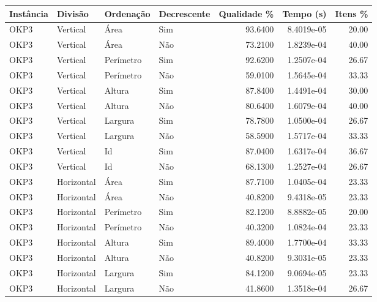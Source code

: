 \begin{tabular}{llllrrr}
    \hline
    Instância & Divisão     & Ordenação & Decrescente & Qualidade \% & Tempo (s)  & Itens \% \\
    \hline
    OKP3      & Vertical    & Área      & Sim         & 93.6400      & 8.4019e-05 & 20.00    \\
    OKP3      & Vertical    & Área      & Não         & 73.2100      & 1.8239e-04 & 40.00    \\
    OKP3      & Vertical    & Perímetro & Sim         & 92.6200      & 1.2507e-04 & 26.67    \\
    OKP3      & Vertical    & Perímetro & Não         & 59.0100      & 1.5645e-04 & 33.33    \\
    OKP3      & Vertical    & Altura    & Sim         & 87.8400      & 1.4491e-04 & 30.00    \\
    OKP3      & Vertical    & Altura    & Não         & 80.6400      & 1.6079e-04 & 40.00    \\
    OKP3      & Vertical    & Largura   & Sim         & 78.7800      & 1.0500e-04 & 26.67    \\
    OKP3      & Vertical    & Largura   & Não         & 58.5900      & 1.5717e-04 & 33.33    \\
    OKP3      & Vertical    & Id        & Sim         & 87.0400      & 1.6317e-04 & 36.67    \\
    OKP3      & Vertical    & Id        & Não         & 68.1300      & 1.2527e-04 & 26.67    \\
    OKP3      & Horizontal  & Área      & Sim         & 87.7100      & 1.0405e-04 & 23.33    \\
    OKP3      & Horizontal  & Área      & Não         & 40.8200      & 9.4318e-05 & 23.33    \\
    OKP3      & Horizontal  & Perímetro & Sim         & 82.1200      & 8.8882e-05 & 20.00    \\
    OKP3      & Horizontal  & Perímetro & Não         & 40.3200      & 1.0824e-04 & 23.33    \\
    OKP3      & Horizontal  & Altura    & Sim         & 89.4000      & 1.7700e-04 & 33.33    \\
    OKP3      & Horizontal  & Altura    & Não         & 40.8200      & 9.3031e-05 & 23.33    \\
    OKP3      & Horizontal  & Largura   & Sim         & 84.1200      & 9.0694e-05 & 23.33    \\
    OKP3      & Horizontal  & Largura   & Não         & 41.8600      & 1.3518e-04 & 26.67    \\

\end{tabular}
